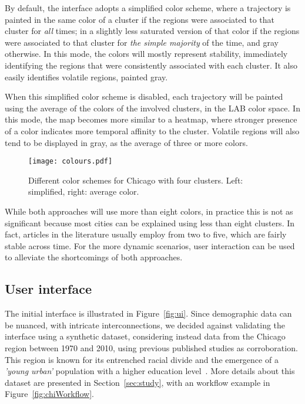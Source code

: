 By default, the interface adopts a simplified color scheme, where a trajectory
is painted in the same color of a cluster if the regions were associated to that
cluster for \emph{all} times; in a slightly less saturated version of that color
if the regions were associated to that cluster for \emph{the simple majority} of
the time, and gray otherwise. In this mode, the colors will mostly represent
stability, immediately identifying the regions that were consistently associated
with each cluster. It also easily identifies volatile regions, painted gray.


When this simplified color scheme is disabled, each trajectory will be painted
using the average of the colors of the involved clusters, in the LAB color
space. In this mode, the map becomes more similar to a heatmap, where stronger
presence of a color indicates more temporal affinity to the cluster. Volatile
regions will also tend to be displayed in gray, as the average of three or more
colors.

\begin{figure}
    \centering 
    \texttt{[image: colours.pdf]}
    \caption{Different color schemes for Chicago with four clusters. Left:
    simplified, right: average color.\label{fig:colour}}
\end{figure}

While both approaches will use more than eight colors, in practice this is not
as significant because most cities can be explained using less than eight
clusters.  In fact, articles in the literature usually employ from two to five,
which are fairly stable across time. For the more dynamic scenarios, user
interaction can be used to alleviate the shortcomings of both approaches.


\subsection{User interface}
\label{sec:ui}
The initial interface is illustrated in Figure~\ref{fig:ui}. Since demographic
data can be nuanced, with intricate interconnections, we decided against
validating the interface using a synthetic dataset, considering instead data
from the Chicago region between 1970 and 2010, using previous published studies
as corroboration. This region is known for its entrenched racial divide and the
emergence of a \emph{'young urban'} population with a higher education
level~\cite{Delmelle2016,Delmelle2017}. More details about this dataset are
presented in Section~\ref{sec:study}, with an workflow example in
Figure~\ref{fig:chiWorkflow}.

